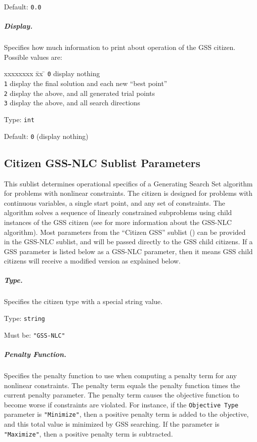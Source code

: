 \hspace{0.2in}
Default: {\tt 0.0}

\subparagraph{Display.}  \label{param:GS-display}
Specifies how much information to print about operation of the GSS citizen.
Possible values are:
\begin{tabbing}
  xxxxxxxx \= xx \= \kill
     \> {\tt 0} \> display nothing  \\
     \> {\tt 1} \> display the final solution and each new ``best point''  \\
     \> {\tt 2} \> display the above, and all generated trial points  \\
     \> {\tt 3} \> display the above, and all search directions  \\
\end{tabbing}

\hspace{0.2in}
Type: {\tt int}

\hspace{0.2in}
Default: {\tt 0} (display nothing)


\subsection{Citizen GSS-NLC Sublist Parameters}
\label{subconfig:GSN}

This sublist determines operational specifics of a Generating Search Set
algorithm for problems with nonlinear constraints.
The citizen is designed for problems
with continuous variables, a single start point, and any set of constraints.
The algorithm solves a sequence of linearly constrained subproblems using
child instances of the GSS citizen (see  for more
information about the GSS-NLC algorithm).
Most parameters from the ``Citizen GSS'' sublist ()
can be provided in the GSS-NLC sublist, and will be passed directly
to the GSS child citizens.
If a GSS parameter is listed below as a GSS-NLC parameter, then it means
GSS child citizens will receive a modified version as explained below.

\subparagraph{Type.}  \label{param:GSN-type}
Specifies the citizen type with a special string value.

\hspace{0.2in}
Type: {\tt string}

\hspace{0.2in}
Must be: {\tt "GSS-NLC"}

\subparagraph{Penalty Function.}  \label{param:GSN-penfn}
Specifies the penalty function to use when computing a penalty term for any
nonlinear constraints.  The penalty term equals the penalty function times
the current penalty parameter.
The penalty term causes the objective function to become
worse if constraints are violated.  For instance, if the {\tt Objective Type}
parameter is {\tt "Minimize"}, then a positive penalty term is added to the
objective, and this total value is minimized by GSS searching.  If the
parameter is {\tt "Maximize"}, then a positive penalty term is subtracted.

